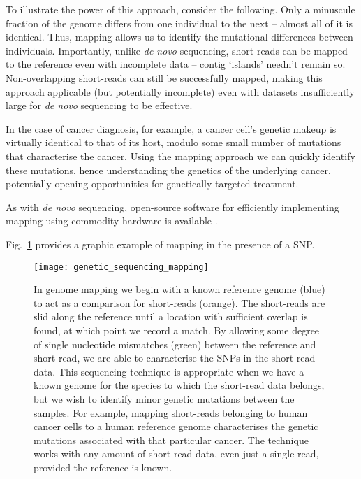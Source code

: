 To illustrate the power of this approach, consider the following. Only a minuscule fraction of the genome differs from one individual to the next -- almost all of it is identical. Thus, mapping allows us to identify the mutational differences between individuals. Importantly, unlike \textit{de novo} sequencing, short-reads can be mapped to the reference even with incomplete data -- contig `islands' needn't remain so. Non-overlapping short-reads can still be successfully mapped, making this approach applicable (but potentially incomplete) even with datasets insufficiently large for \textit{de novo} sequencing to be effective.

In the case of cancer diagnosis, for example, a cancer cell's genetic makeup is virtually identical to that of its host, modulo some small number of mutations that characterise the cancer. Using the mapping approach we can quickly identify these mutations, hence understanding the genetics of the underlying cancer, potentially opening opportunities for genetically-targeted treatment.

As with \textit{de novo} sequencing, open-source software for efficiently implementing mapping using commodity hardware is available \cite{Bfast etc}.

Fig.~\ref{fig:gen_seq_mapping} provides a graphic example of mapping in the presence of a SNP.

\begin{figure}[!htbp]
	\texttt{[image: genetic\_sequencing\_mapping]}
	\captionspacefig \caption{In genome mapping we begin with a known reference genome (blue) to act as a comparison for short-reads (orange). The short-reads are slid along the reference until a location with sufficient overlap is found, at which point we record a match. By allowing some degree of single nucleotide mismatches (green) between the reference and short-read, we are able to characterise the SNPs in the short-read data. This sequencing technique is appropriate when we have a known genome for the species to which the short-read data belongs, but we wish to identify minor genetic mutations between the samples. For example, mapping short-reads belonging to human cancer cells to a human reference genome characterises the genetic mutations associated with that particular cancer. The technique works with any amount of short-read data, even just a single read, provided the reference is known.} \label{fig:gen_seq_mapping}
\end{figure}


